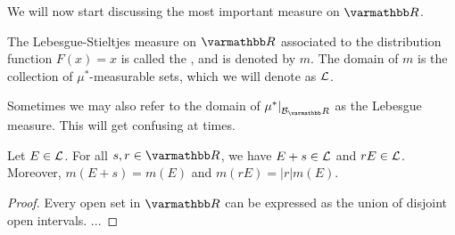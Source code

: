     We will now start discussing the most important measure on $\bfR$.

    \begin{definition}
        The Lebesgue-Stieltjes measure on $\bfR$ associated to the distribution function $F(x) = x$ is called the , and is denoted by $m$. The domain of $m$ is the collection of $\mu^\ast$-measurable sets, which we will denote as $\mathcal{L}$.
    \end{definition}

    Sometimes we may also refer to the domain of $\restr{\mu^\ast}{\cB_\bfR}$ as the Lebesgue measure. This will get confusing at times.

    \begin{theorem}
        Let $E \in \mathcal{L}$. For all $s,r \in \bfR$, we have $E+s \in \mathcal{L}$ and $rE \in \mathcal{L}$. Moreover, $m(E +s) = m(E)$ and $m(rE) = |r|m(E)$.
    \end{theorem}
        \begin{proof}
            Every open set in $\bfR$ can be expressed as the  union of disjoint open intervals. {\color{red} ...}
        \end{proof}

\iffalse
